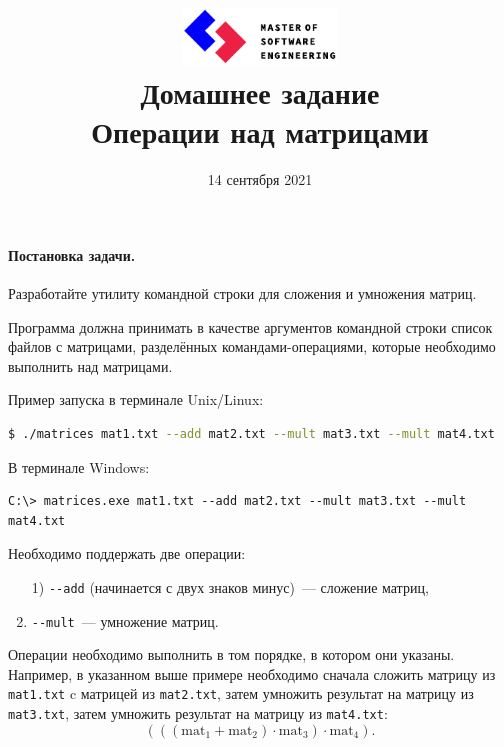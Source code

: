 \documentclass[a4paper,10pt]{article}
\begin{document}

\lstset{
  basicstyle=\ttfamily,
  columns=fullflexible
}

\title{\includegraphics[height=15mm]{../mse-logo}\\[1em]
Домашнее задание  \\ Операции над матрицами}
\preauthor{}
\author{}
\postauthor{}
\date{14 сентября 2021}

\maketitle

\paragraph{Постановка задачи.}
Разработайте утилиту командной строки для сложения и умножения матриц.

Программа должна принимать в качестве аргументов командной строки список файлов с матрицами, 
разделённых командами-операциями, которые необходимо выполнить над матрицами.

Пример запуска в терминале Unix/Linux:

\begin{lstlisting}[language=bash, frame=single]
$ ./matrices mat1.txt --add mat2.txt --mult mat3.txt --mult mat4.txt
\end{lstlisting}

В терминале Windows:

\begin{lstlisting}[language=command.com, frame=single]
C:\> matrices.exe mat1.txt --add mat2.txt --mult mat3.txt --mult mat4.txt
\end{lstlisting}

Необходимо поддержать две операции:
\begin{enumerate}
  \item[1)] \lstinline[language=bash]`--add` (начинается с двух знаков минус)~--- сложение матриц,
  \item[2)] \lstinline[language=bash]`--mult`~--- умножение матриц.
\end{enumerate}

Операции необходимо выполнить в том порядке, в котором они указаны.
Например, в указанном выше примере необходимо сначала сложить матрицу из \texttt{mat1.txt} c матрицей из \texttt{mat2.txt},
затем умножить результат на матрицу из \texttt{mat3.txt},
затем умножить результат на матрицу из \texttt{mat4.txt}:
$$
  (((\mathrm{mat}_1 + \mathrm{mat}_2) \cdot \mathrm{mat}_3) \cdot \mathrm{mat}_4).
$$
\end{document}
